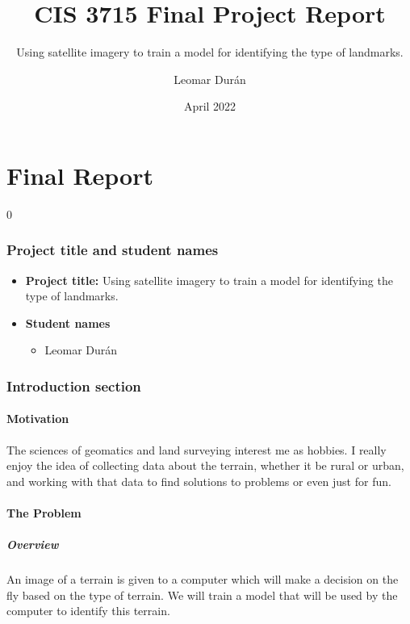 \documentclass[11pt]{report}
\title{CIS 3715 Final Project Report}
\subtitle{Using satellite imagery to train a model for identifying the type of landmarks.}
\author{Leomar Durán}
\date{April 2022}
\let\oldpart\part%
\renewcommand*\part[1]{\oldpart{#1}\setcounter{section}0}%
\begin{document}
\maketitle

\part{Final Report}

\section*{Project title and student names}
\begin{itemize}
    \item
        \textbf{Project title:}
        Using satellite imagery to train a model for identifying the type of landmarks.
    \item
        \textbf{Student names} 
        \begin{itemize}
            \item
                Leomar Durán
        \end{itemize}
\end{itemize}

\section{Introduction section}

\subsection{Motivation}

The sciences of geomatics and land surveying interest me as hobbies.
I really enjoy the idea of collecting data about the terrain,
whether it be rural or urban,
and working with that data to find solutions to problems
or even just for fun.

\subsection{The Problem}

\subsubsection{Overview}

An image of a terrain is given to a computer which will make a decision on the fly based on the type of terrain.
We will train a model that will be used by the computer to identify this terrain.
\end{document}

